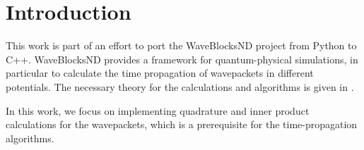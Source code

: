 \section{Introduction}

This work is part of an effort to port the WaveBlocksND project
\cite{waveblocksnd} from Python to C++.
WaveBlocksND provides a framework for quantum-physical simulations, in
particular to calculate the time propagation of wavepackets in different
potentials.
The necessary theory for the calculations and algorithms is given in
\cite{B_master_thesis}.

In this work, we focus on implementing quadrature and inner product calculations
for the wavepackets, which is a prerequisite for the time-propagation
algorithms.
